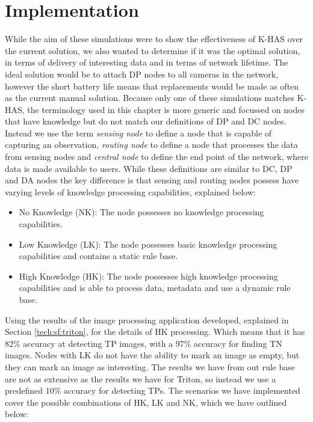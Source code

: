 \section{Implementation}\label{sim:imp}
	While the aim of these simulations were to show the effectiveness of K-HAS over the current solution, we also wanted to determine if it was the optimal solution, in terms of delivery of interesting data and in terms of network lifetime. The ideal solution would be to attach DP nodes to all cameras in the network, however the short battery life means that replacements would be made as often as the current manual solution. Because only one of these simulations matches K-HAS, the terminology used in this chapter is more generic and focussed on nodes that have knowledge but do not match our definitions of DP and DC nodes. Instead we use the term \textit{sensing node} to define a node that is capable of capturing an observation, \textit{routing node} to define a node that processes the data from sensing nodes and \textit{central node} to define the end point of the network, where data is made available to users. While these definitions are similar to DC, DP and DA nodes the key difference is that sensing and routing nodes possess have varying levels of knowledge processing capabilities, explained below:
	
	\begin{itemize}
		\item No Knowledge (NK): The node possesses no knowledge processing capabilities.
		\item Low Knowledge (LK): The node possesses basic knowledge processing capabilities and contains a static rule base.
		\item High Knowledge (HK): The node possesses high knowledge processing capabilities and is able to process data, metadata and use a dynamic rule base.
	\end{itemize}
	
	Using the results of the image processing application developed, explained in Section \ref{tech:sf:triton}, for the details of HK processing. Which means that it has 82\% accuracy at detecting TP images, with a 97\% accuracy for finding TN images. Nodes with LK do not have the ability to mark an image as empty, but they can mark an image as interesting. The results we have from out rule base are not as extensive as the results we have for Triton, so instead we use a predefined 10\% accuracy for detecting TPs. The scenarios we have implemented cover the possible combinations of HK, LK and NK, which we have outlined below:
	
